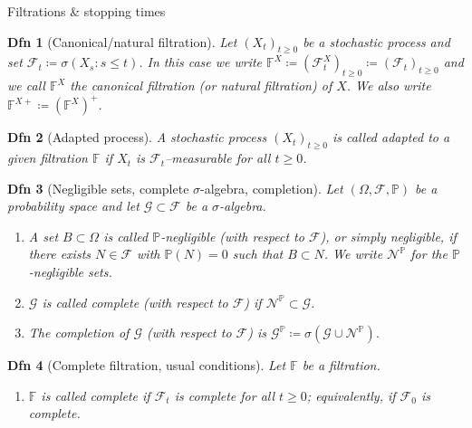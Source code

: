 \documentclass[a4paper]{article}
\theoremstyle{mytheoremstyle}
\newtheorem{definition}{Dfn}
\newcommand{\1}{\mathds{1}}
\begin{document}
\begin{multicols*}{3}
\begin{roundbox}{Filtrations \& stopping times}
\begin{definition}[Canonical/natural filtration]
  Let $(X_t)_{t \geqslant 0}$ be a stochastic process and set $\mathcal{F}_t
  \coloneq \sigma (X_s : s \leqslant t)$. In this case we write $\mathbb{F}^X
  \coloneq (\mathcal{F}_t^X)_{t \geqslant 0} \coloneq (\mathcal{F}_t)_{t
  \geqslant 0}$ and we call $\mathbb{F}^X$ the {\emph{canonical filtration}}
  (or \emph{natural filtration}) of $X$. We also write $\mathbb{F}^{X +}
  \coloneq (\mathbb{F}^X)^+$.
\end{definition}

\begin{definition}[Adapted process]
  A stochastic process $(X_t)_{t \geqslant 0}$ is called {\emph{adapted}} to a
  given filtration $\mathbb{F}$ if $X_t$ is $\mathcal{F}_t$--measurable for
  all $t \geqslant 0$.
\end{definition}

\begin{definition}[Negligible sets, complete $\sigma$-algebra, completion]
  Let $(\Omega, \mathcal{F}, \mathbb{P})$ be a probability space and let
  $\mathcal{G} \subset \mathcal{F}$ be a $\sigma$-algebra.
  \begin{enumerate}[parsep=0.2pt]
    \item A set $B \subset \Omega$ is called {\emph{$\mathbb{P}$-negligible}}
    (with respect to $\mathcal{F}$), or simply {\emph{negligible}},
    if there exists $N \in \mathcal{F}$ with $\mathbb{P} (N) = 0$ such that $B
    \subset N$. We write $\mathcal{N}^{\mathbb{P}}$ for the
    $\mathbb{P}$-negligible sets.
    
    \item $\mathcal{G}$ is called {\emph{complete}} (with respect to
    $\mathcal{F}$) if $\mathcal{N}^{\mathbb{P}} \subset \mathcal{G}$.
    
    \item The {\emph{completion of $\mathcal{G}$}} (with respect to
    $\mathcal{F}$) is $\mathcal{G}^{\mathbb{P}} \coloneq \sigma (\mathcal{G}
    \cup \mathcal{N}^{\mathbb{P}}) .$
  \end{enumerate}
\end{definition}

\begin{definition}[Complete filtration, usual conditions]
  Let $\mathbb{F}$ be a filtration.
  \begin{enumerate}[parsep=0.2pt]
    \item $\mathbb{F}$ is called {\emph{complete}} if $\mathcal{F}_t$ is
    complete for all $t \geqslant 0$; equivalently, if $\mathcal{F}_0$ is
    complete.
    

\end{enumerate}
\end{definition}
\end{roundbox}
\end{multicols*}
\end{document}
